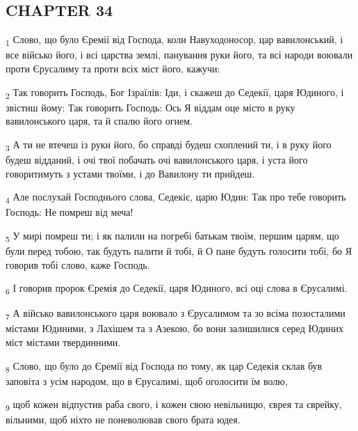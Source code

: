 \subsection{CHAPTER 34}
\begin{tcolorbox}
\textsubscript{1} Слово, що було Єремії від Господа, коли Навуходоносор, цар вавилонський, і все військо його, і всі царства землі, панування руки його, та всі народи воювали проти Єрусалиму та проти всіх міст його, кажучи:
\end{tcolorbox}
\begin{tcolorbox}
\textsubscript{2} Так говорить Господь, Бог Ізраїлів: Іди, і скажеш до Седекії, царя Юдиного, і звістиш йому: Так говорить Господь: Ось Я віддам оце місто в руку вавилонського царя, та й спалю його огнем.
\end{tcolorbox}
\begin{tcolorbox}
\textsubscript{3} А ти не втечеш із руки його, бо справді будеш схоплений ти, і в руку його будеш відданий, і очі твої побачать очі вавилонського царя, і уста його говоритимуть з устами твоїми, і до Вавилону ти прийдеш.
\end{tcolorbox}
\begin{tcolorbox}
\textsubscript{4} Але послухай Господнього слова, Седекіє, царю Юдин: Так про тебе говорить Господь: Не помреш від меча!
\end{tcolorbox}
\begin{tcolorbox}
\textsubscript{5} У мирі помреш ти; і як палили на погребі батькам твоїм, першим царям, що були перед тобою, так будуть палити й тобі, й О пане будуть голосити тобі, бо Я говорив тобі слово, каже Господь.
\end{tcolorbox}
\begin{tcolorbox}
\textsubscript{6} І говорив пророк Єремія до Седекії, царя Юдиного, всі оці слова в Єрусалимі.
\end{tcolorbox}
\begin{tcolorbox}
\textsubscript{7} А військо вавилонського царя воювало з Єрусалимом та зо всіма позосталими містами Юдиними, з Лахішем та з Азекою, бо вони залишилися серед Юдиних міст містами твердинними.
\end{tcolorbox}
\begin{tcolorbox}
\textsubscript{8} Слово, що було до Єремії від Господа по тому, як цар Седекія склав був заповіта з усім народом, що в Єрусалимі, щоб оголосити їм волю,
\end{tcolorbox}
\begin{tcolorbox}
\textsubscript{9} щоб кожен відпустив раба свого, і кожен свою невільницю, єврея та єврейку, вільними, щоб ніхто не поневолював свого брата юдея.
\end{tcolorbox}
